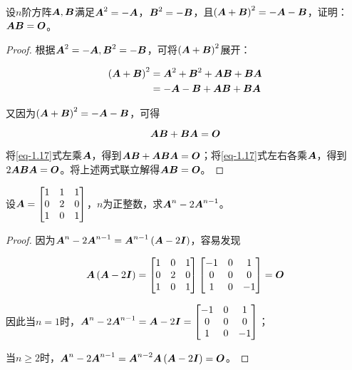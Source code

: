 \begin{problem}
设\(n\)阶方阵\(\mata,\matb\)满足\(\mata^2=-\mata\)，\(\matb^2=-\matb\)，且\(\mypar{\mata+\matb}^2=-\mata-\matb\)，证明：\(\mata\matb=\mato\)。
\end{problem}
\begin{proof}
    根据\(\mata^2=-\mata,\matb^2=-\matb\)，可将\(\mypar{\mata+\matb}^2\)展开：

    \begin{align*}
        \mypar{\mata+\matb}^2 & =\mata^2+\matb^2+\mata\matb+\matb\mata \\
                              & =-\mata-\matb+\mata\matb+\matb\mata
    \end{align*}

    又因为\(\mypar{\mata+\matb}^2=-\mata-\matb\)，可得

    \begin{equation}\label{eq-1.17}
        \mata\matb+\matb\mata=\mato
    \end{equation}

    将\eqref{eq-1.17}式左乘\(\mata\)，得到\(\mata\matb+\mata\matb\mata=\mato\)；将\eqref{eq-1.17}式左右各乘\(\mata\)，得到\(2\mata\matb\mata=\mato\)。将上述两式联立解得\(\mata\matb=\mato\)。
\end{proof}

\begin{problem}
设\(\mata=\begin{bmatrix}1&1&1\\0&2&0\\1&0&1\end{bmatrix}\)，\(n\)为正整数，求\(\mata^n-2\mata^{n-1}\)。
\end{problem}
\begin{proof}
    因为\(\mata^n-2\mata^{n-1}=\mata^{n-1}\mypar{\mata-2\mati}\)，容易发现

    \begin{equation*}
        \mata\mypar{\mata-2\mati}=
        \begin{bmatrix}
            1 & 0 & 1 \\0&2&0\\1&0&1
        \end{bmatrix}
        \begin{bmatrix}
            -1 & 0 & 1 \\0&0&0\\1&0&-1
        \end{bmatrix}=\mato
    \end{equation*}

    因此当\(n=1\)时，\(\mata^n-2\mata^{n-1}=\mata-2\mati=\begin{bmatrix}-1 & 0 & 1 \\0&0&0\\1&0&-1\end{bmatrix}\)；

    当\(n\ge2\)时，\(\mata^n-2\mata^{n-1}=\mata^{n-2}\mata\mypar{\mata-2\mati}=\mato\)。
\end{proof}

